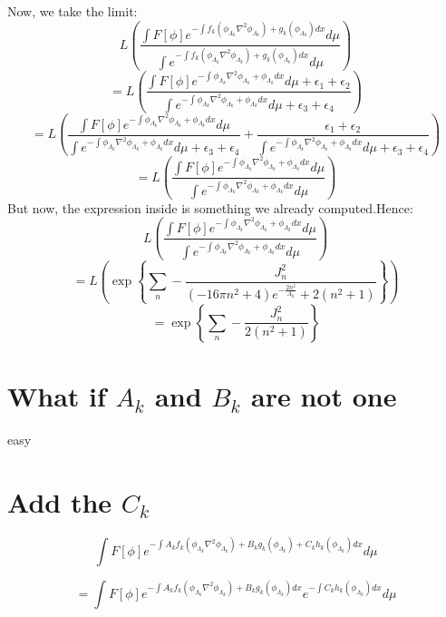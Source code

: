 \documentclass{article}
\theoremstyle{definition}
\begin{document}
Now, we take the limit:
\[
L\left(\frac{\int F[\phi]e^{-\int f_k\left(\phi_{\Lambda_k} \nabla^2 \phi_{\Lambda_k}\right) + g_k\left(\phi_{\Lambda_k}\right) dx}d\mu}{\int e^{-\int f_k\left(\phi_{\Lambda_k} \nabla^2 \phi_{\Lambda_k}\right) + g_k\left(\phi_{\Lambda_k}\right) dx}d\mu}   \right)
\]
\[
=L\left(\frac{\int F[\phi]e^{-\int \phi_{\Lambda_k} \nabla^2 \phi_{\Lambda_k} + \phi_{\Lambda_k} dx}d\mu + \epsilon_1 +\epsilon_2}{\int e^{-\int \phi_{\Lambda_k} \nabla^2 \phi_{\Lambda_k} + \phi_{\Lambda_k} dx}d\mu + \epsilon_3 +\epsilon_4}   \right)
\]
\[
=L\left(\frac{\int F[\phi]e^{-\int \phi_{\Lambda_k} \nabla^2 \phi_{\Lambda_k} + \phi_{\Lambda_k} dx}d\mu}{\int e^{-\int \phi_{\Lambda_k} \nabla^2 \phi_{\Lambda_k} + \phi_{\Lambda_k} dx}d\mu + \epsilon_3 +\epsilon_4}   
+ \frac{\epsilon_1 +\epsilon_2}{\int e^{-\int \phi_{\Lambda_k} \nabla^2 \phi_{\Lambda_k} + \phi_{\Lambda_k} dx}d\mu + \epsilon_3 +\epsilon_4}\right)\]
\[
=L\left(\frac{\int F[\phi]e^{-\int \phi_{\Lambda_k} \nabla^2 \phi_{\Lambda_k} + \phi_{\Lambda_k} dx}d\mu}{\int e^{-\int \phi_{\Lambda_k} \nabla^2 \phi_{\Lambda_k} + \phi_{\Lambda_k} dx}d\mu}\right) 
\]
But now, the expression inside is something we already computed.Hence:
\[
L\left(\frac{\int F[\phi]e^{-\int \phi_{\Lambda_k} \nabla^2 \phi_{\Lambda_k} + \phi_{\Lambda_k} dx}d\mu}{\int e^{-\int \phi_{\Lambda_k} \nabla^2 \phi_{\Lambda_k} + \phi_{\Lambda_k} dx}d\mu}\right)
\]
\[
= L\left(\exp\left\{\sum_{n} -\frac{J_n^2}{\left(-16\pi n^2+4\right) e^{-\frac{2n^2}{\Lambda_k}}+ 2\left(n^2+1\right)}\right\}\right)
\]
\[
=\exp\left\{\sum_{n} -\frac{J_n^2}{2\left(n^2+1\right)}\right\}
\]

\section{What if $A_k$ and $B_k$ are not one}
easy
\section{Add the $C_k$}
\[
\int F[\phi]e^{-\int A_k f_k\left(\phi_{\Lambda_k} \nabla^2 \phi_{\Lambda_k}\right) + B_k g_k\left(\phi_{\Lambda_k}\right) + C_k h_k\left(\phi_{\Lambda_k}\right)dx}d\mu 
\]

\[
=\int F[\phi]e^{-\int A_k f_k\left(\phi_{\Lambda_k} \nabla^2 \phi_{\Lambda_k}\right) + B_k g_k\left(\phi_{\Lambda_k}\right)dx} e^{-\int C_k h_k\left(\phi_{\Lambda_k}\right)dx}d\mu 
\]
\end{document}

